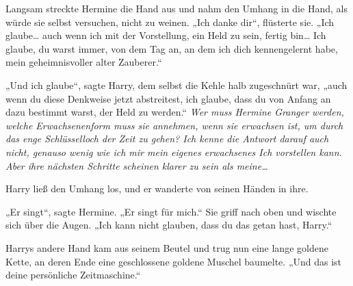 Langsam streckte Hermine die Hand aus und nahm den Umhang in die Hand, als würde sie selbst versuchen, nicht zu weinen.
„Ich danke dir“, flüsterte sie. „Ich glaube… auch wenn ich mit der Vorstellung, ein Held zu sein, fertig bin… Ich glaube, du warst immer, von dem Tag an, an dem ich dich kennengelernt habe, mein geheimnisvoller alter Zauberer.“

„Und ich glaube“, sagte Harry, dem selbst die Kehle halb zugeschnürt war, „auch wenn du diese Denkweise jetzt abstreitest, ich glaube, dass du von Anfang an dazu bestimmt warst, der Held zu werden.“
\emph{Wer muss Hermine Granger werden, welche Erwachsenenform muss sie annehmen, wenn sie erwachsen ist, um durch das enge Schlüsselloch der Zeit zu gehen? Ich kenne die Antwort darauf auch nicht, genauso wenig wie ich mir mein eigenes erwachsenes Ich vorstellen kann. Aber ihre nächsten Schritte scheinen klarer zu sein als meine…}

Harry ließ den Umhang los, und er wanderte von seinen Händen in ihre.

„Er singt“, sagte Hermine. „Er singt für mich.“ Sie griff nach oben und wischte sich über die Augen. „Ich kann nicht glauben, dass du das getan hast, Harry.“

Harrys andere Hand kam aus seinem Beutel und trug nun eine lange goldene Kette, an deren Ende eine geschlossene goldene Muschel baumelte.
„Und das ist deine persönliche Zeitmaschine.“

